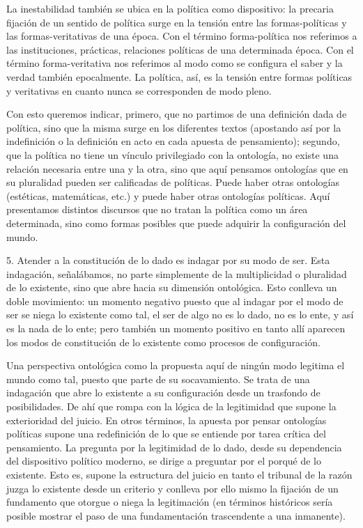 \documentclass{book}
\begin{document}
La inestabilidad también se ubica en la política como dispositivo: la
precaria fijación de un sentido de política surge en la tensión entre
las formas-políticas y las formas-veritativas de una época. Con el
término forma-política nos referimos a las instituciones, prácticas,
relaciones políticas de una determinada época. Con el término
forma-veritativa nos referimos al modo como se configura el saber y la
verdad también epocalmente. La política, así, es la tensión entre formas
políticas y veritativas en cuanto nunca se corresponden de modo pleno.

Con esto queremos indicar, primero, que no partimos de una definición
dada de política, sino que la misma surge en los diferentes textos
(apostando así por la indefinición o la definición en acto en cada
apuesta de pensamiento); segundo, que la política no tiene un vínculo
privilegiado con la ontología, no existe una relación necesaria entre
una y la otra, sino que aquí pensamos ontologías que en su pluralidad
pueden ser calificadas de políticas. Puede haber otras ontologías
(estéticas, matemáticas, etc.) y puede haber otras ontologías políticas.
Aquí presentamos distintos discursos que no tratan la política como un
área determinada, sino como formas posibles que puede adquirir la
configuración del mundo.

5. Atender a la constitución de lo dado es indagar por su modo de ser. Esta
indagación, señalábamos, no parte simplemente de la multiplicidad o
pluralidad de lo existente, sino que abre hacia su dimensión ontológica.
Esto conlleva un doble movimiento: un momento negativo puesto que al
indagar por el modo de ser se niega lo existente como tal, el ser de
algo no es lo dado, no es lo ente, y así es la nada de lo ente; pero
también un momento positivo en tanto allí aparecen los modos de
constitución de lo existente como procesos de configuración.

Una perspectiva ontológica como la propuesta aquí de ningún modo
legitima el mundo como tal, puesto que parte de su socavamiento. Se
trata de una indagación que abre lo existente a su configuración desde
un trasfondo de posibilidades. De ahí que rompa con la lógica de la
legitimidad que supone la exterioridad del juicio. En otros términos, la
apuesta por pensar ontologías políticas supone una redefinición de lo
que se entiende por tarea crítica del pensamiento. La pregunta por la
legitimidad de lo dado, desde su dependencia del dispositivo político
moderno, se dirige a preguntar por el porqué de lo existente. Esto es,
supone la estructura del juicio en tanto el tribunal de la razón juzga
lo existente desde un criterio y conlleva por ello mismo la fijación de
un fundamento que otorgue o niega la legitimación (en términos
históricos sería posible mostrar el paso de una fundamentación
trascendente a una inmanente).
\end{document}
